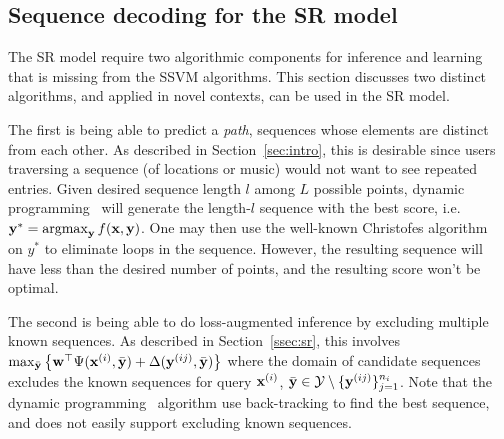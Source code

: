 
\subsection{Sequence decoding for the SR model}
\label{ssec:subtour}

The SR model require two algorithmic components for inference and learning that is missing from the SSVM algorithms. 
This section discusses two distinct algorithms, and applied in novel contexts, can be used in the SR model. 

The first is being able to predict a {\em path}, \ie sequences whose elements are distinct from each other. 
As described in Section~\ref{sec:intro}, this is desirable since users traversing a sequence (of locations or music)
would not want to see repeated entries. 
Given desired sequence length $l$ among $L$ possible points, dynamic programming~\cite{tsochantaridis2005large} 
will generate the length-$l$ sequence with the best score, i.e. $\mathbf{y}^* = \operatorname*{argmax}_{\mathbf{y}} f(\mathbf{x},\mathbf{y})$. 
One may then use the well-known 
Christofes algorithm~\cite{christofides1976} on $y^*$ to eliminate loops in the sequence. 
However, the resulting sequence will have less than the desired number of points, and the resulting score won't be optimal. 

The second is being able to do loss-augmented inference by excluding multiple known sequences. 
As described in Section~\ref{ssec:sr}, this involves %
$\max_{\bar{\mathbf{y}}} \left\{ \mathbf{w}^\top \Psi(\mathbf{x}^{(i)}, \bar{\mathbf{y}}) + \Delta(\mathbf{y}^{(ij)}, \bar{\mathbf{y}}) \right\}$
where the domain of candidate sequences excludes the known sequences for query $\mathbf{x}^{(i)}$, \ie $\bar{\mathbf{y}} \in \mathcal{Y} \setminus \{\mathbf{y}^{(ij)}\}_{j=1}^{n_i}$. 
Note that the dynamic programming~\cite{tsochantaridis2005large} algorithm use back-tracking to find the best sequence, 
and does not easily support excluding known sequences. 


